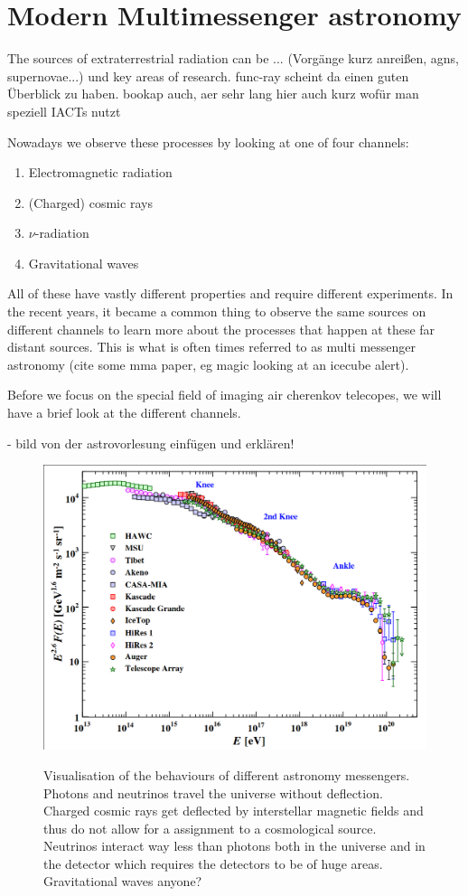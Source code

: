 \section{Modern Multimessenger astronomy}

The sources of extraterrestrial radiation can be ...
(Vorgänge kurz anreißen, agns, supernovae...)
und key areas of research. func-ray scheint da einen guten Überblick zu haben. bookap auch, aer sehr lang
hier auch kurz wofür man speziell IACTs nutzt

Nowadays we observe these processes by looking at one of four channels: 
\begin{enumerate}
	\item Electromagnetic radiation
	\item (Charged) cosmic rays
	\item $\nu$-radiation
	\item Gravitational waves
\end{enumerate}

All of these have vastly different properties and require different experiments.
In the recent years, it became a common thing to observe the same sources 
on different channels to learn more about the processes that happen at 
these far distant sources. This is what is often times 
referred to as multi messenger astronomy (cite some mma paper, eg magic looking at an icecube alert).

Before we focus on the special field of imaging air cherenkov telecopes, we will have
a brief look at the different channels.

- bild von der astrovorlesung einfügen und erklären!
\begin{figure}
	\includegraphics[width=.8\textwidth]{images/cr_spectrum.png}
	\label{fig:multi_messenger}
	\caption{Visualisation of the behaviours of different astronomy messengers. Photons and neutrinos 
		travel the universe without deflection. Charged cosmic rays get deflected by interstellar
		magnetic fields and thus do not allow for a assignment to a cosmological source.
		Neutrinos interact way less than photons both in the universe and in the detector 
		which requires the detectors to be of huge areas. Gravitational waves anyone?
	}
\end{figure}


